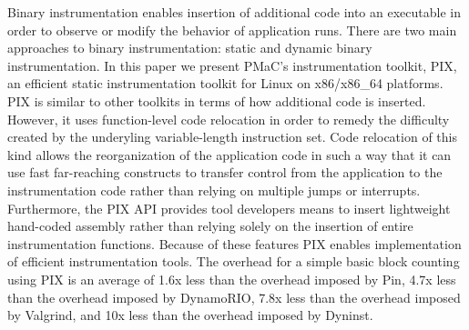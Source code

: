 \begin{it}

Binary instrumentation enables insertion of additional code into an
executable in order to observe or modify the behavior of application runs. 
There are two main approaches to binary instrumentation: static and dynamic
binary instrumentation. In this paper we present PMaC's instrumentation toolkit, PIX, 
an efficient static instrumentation toolkit for Linux on x86/x86\_64 platforms. PIX
is similar to  other toolkits in terms of how additional code is inserted. However, it uses function-level
code relocation in order to remedy the difficulty created by the underyling variable-length instruction set. 
Code relocation of this kind allows the reorganization of the application code in such a way that it
can use fast far-reaching constructs to transfer control
from the application to the instrumentation code rather than relying on multiple
jumps or interrupts. Furthermore, the PIX API provides 
tool developers means to insert lightweight hand-coded assembly
rather than relying solely on the insertion of entire instrumentation functions.
Because of these features PIX enables implementation of efficient instrumentation tools. 
The overhead for a simple basic block counting using PIX is an
average of 1.6x less than the overhead imposed by Pin, 4.7x less than the overhead imposed by
DynamoRIO, 7.8x less than the overhead imposed by Valgrind, and 10x less than the overhead imposed by Dyninst.

\end{it}
